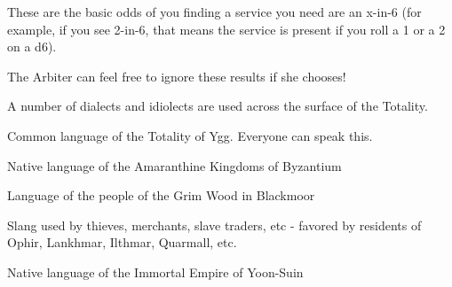 {  These are the basic odds of you finding a service you need are an x-in-6 (for example, if you see 2-in-6, that means the service is present if you  roll a 1 or a 2 on a d6).

  The Arbiter can feel free to ignore these results if she chooses!



  \newpage



  A number of dialects and idiolects are used across the surface of the Totality.
  


  Common language of the Totality of Ygg.  Everyone can speak this.


  Native language of the Amaranthine Kingdoms of Byzantium


  Language of the people of the Grim Wood in Blackmoor



  Slang used by thieves, merchants, slave traders, etc - favored by residents of Ophir, Lankhmar, Ilthmar, Quarmall, etc.


  Native language of the Immortal Empire of Yoon-Suin

}
